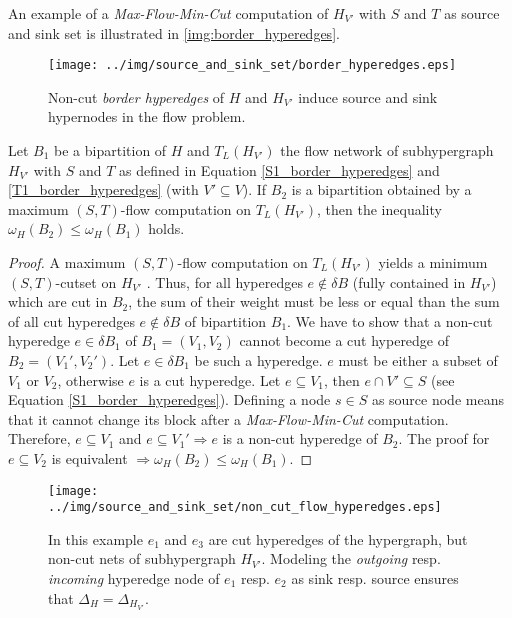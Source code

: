 An example of a \emph{Max-Flow-Min-Cut} computation of $H_{V'}$ with $S$ and $T$ as source and
sink set is illustrated in \autoref{img:border_hyperedges}.
\begin{figure}
\centering
\texttt{[image: ../img/source\_and\_sink\_set/border\_hyperedges.eps]}
\caption{Non-cut \emph{border hyperedges} of $H$ and $H_{V'}$ induce source and sink hypernodes
         in the flow problem.}
\label{img:border_hyperedges}
\end{figure}

\begin{lemma}
\label{cut_decrease_proof}
Let $B_1$ be a bipartition of $H$ and $T_L(H_{V'})$ the flow network of subhypergraph
$H_{V'}$ with $S$ and $T$ as defined in Equation \ref{S1_border_hyperedges} and \ref{T1_border_hyperedges} (with $V' \subseteq V$).
If $B_2$ is a bipartition obtained by a maximum $(S,T)$-flow computation on $T_L(H_{V'})$,
then the inequality $\omega_H(B_2) \le \omega_H(B_1)$ holds.
\end{lemma}

\begin{proof}
A maximum $(S,T)$-flow computation on $T_L(H_{V'})$ yields a minimum $(S,T)$-cutset on 
$H_{V'}$ \cite{ford1956maximal}. Thus, for all hyperedges $e \notin \delta B$ (fully contained in $H_{V'}$)
which are cut in $B_2$, the sum of their weight must be less or equal than the sum of all cut hyperedges
$e \notin \delta B$ of bipartition $B_1$. We have to show that a non-cut
hyperedge $e \in \delta B_1$ of $B_1 = (V_1,V_2)$ cannot become a cut hyperedge of
$B_2 = (V_1',V_2')$. Let $e \in \delta B_1$ be such a hyperedge. $e$ must be either a subset of $V_1$ or $V_2$, otherwise
$e$ is a cut hyperedge. Let $e \subseteq V_1$, then $e \cap V' \subseteq S$ (see Equation \ref{S1_border_hyperedges}). 
Defining a node $s \in S$ as source node means that it cannot change its block after a \emph{Max-Flow-Min-Cut}
computation. Therefore, $e \subseteq V_1$ and $e \subseteq V_1' \Rightarrow e$ is a non-cut
hyperedge of $B_2$. The proof for $e \subseteq V_2$ is equivalent $\Rightarrow \omega_H(B_2) 
\le \omega_H(B_1)$.
\end{proof} 
\begin{figure}[ht!]
\centering
\texttt{[image: ../img/source\_and\_sink\_set/non\_cut\_flow\_hyperedges.eps]}
\caption{In this example $e_1$ and $e_3$ are cut hyperedges of the hypergraph, but non-cut nets
        of subhypergraph $H_{V'}$. Modeling the \emph{outgoing} resp.
        \emph{incoming} hyperedge node of $e_1$ resp. $e_2$ as sink resp. source ensures
        that $\Delta_H = \Delta_{H_{V'}}$.} 
\label{img:non_cut_flow_hyperedges}
\end{figure}

